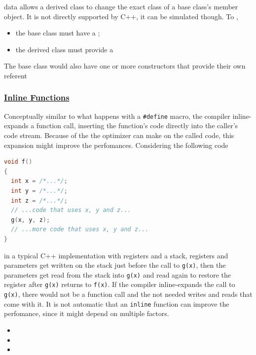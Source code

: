  data allows a derived class to change the exact 
class of a base class's member object. It is not directly supported by C++, 
it can be simulated though.
\newline
To ,
\begin{itemize}
    \item the base class must have a ;
    \item the derived class must provide a 
\end{itemize}
The base class would also have one or more constructors that provide their own 
referent


\subsubsection{\href{https://isocpp.org/wiki/faq/inline-functions}{Inline Functions}}
Conceptually similar to what happens with a \texttt{\#define} macro, 
the compiler inline-expands a function call, inserting the function's 
code directly into the caller's code stream.
\newline
Because of the  the optimizer can 
make on the called code, this expansion might improve the perfomances. 
Considering the following code
\begin{lstlisting}[language=C++]
void f()
{
  int x = /*...*/;
  int y = /*...*/;
  int z = /*...*/;
  // ...code that uses x, y and z...
  g(x, y, z);
  // ...more code that uses x, y and z...
}
\end{lstlisting}
in a typical C++ implementation with registers and a stack, registers 
and parameters get written on the stack just before the call to \texttt{g(x)}, 
then the parameters get read from the stack into \texttt{g(x)} and read 
again to restore the register after \texttt{g(x)} returns to \texttt{f(x)}.
\newline
If the compiler inline-expands the call to \texttt{g(x)}, there would not 
be a function call and the not needed writes and reads that come with it.
\newline
It is not automatic that an \texttt{inline} function can improve the 
perfomance, since it might depend on multiple factors.
\begin{itemize}
    \item 
    \item 
    \item 
\end{itemize}

